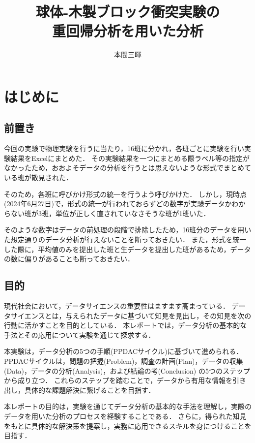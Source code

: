 \documentclass[titlepage,a4paper]{jsarticle}
\title{球体-木製ブロック衝突実験の\\重回帰分析を用いた分析}
\author{本間三暉}
\begin{document}
\maketitle
\section{はじめに}
\subsection{前置き}
今回の実験で物理実験を行うに当たり，16班に分かれ，各班ごとに実験を行い実験結果をExcelにまとめた．
その実験結果を一つにまとめる際ラベル等の指定がなかったため，おおよそデータの分析を行うとは思えないような形式でまとめている班が散見された．

そのため，各班に呼びかけ形式の統一を行うよう呼びかけた．
しかし，現時点(2024年6月27日)で，形式の統一が行われておらずどの数字が実験データかわからない班が3班，単位が正しく直されていなさそうな班が1班いた．

そのような数字はデータの前処理の段階で排除したため，16班分のデータを用いた想定通りのデータ分析が行えないことを断っておきたい．
また，形式を統一した際に，平均値のみを提出した班と生データを提出した班があるため，データの数に偏りがあることも断っておきたい．

\subsection{目的}
現代社会において，データサイエンスの重要性はますます高まっている．
データサイエンスとは，与えられたデータに基づいて知見を見出し，その知見を次の行動に活かすことを目的としている．
本レポートでは，データ分析の基本的な手法とその応用について実験を通じて探求する．

本実験は，データ分析の5つの手順(PPDACサイクル)に基づいて進められる．
PPDACサイクルは，問題の把握(Problem)，調査の計画(Plan)，データの収集(Data)，データの分析(Analysis)，および結論の考(Conclusion)
の5つのステップから成り立つ．
これらのステップを踏むことで，データから有用な情報を引き出し，具体的な課題解決に繋げることを目指す．

本レポートの目的は，実験を通じてデータ分析の基本的な手法を理解し，実際のデータを用いた分析のプロセスを経験することである．
さらに，得られた知見をもとに具体的な解決策を提案し，実務に応用できるスキルを身につけることを目指す．
\end{document}
